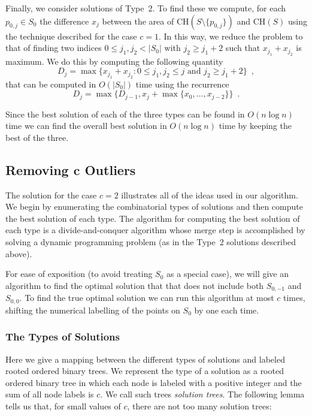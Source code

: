 \documentclass[lotsofwhite]{patmorin}
\newcommand{\ch}{\mathrm{CH}}
\begin{document}
Finally, we consider solutions of Type~2.  To find these we compute,
for each $p_{0,j}\in S_0$ the difference $x_j$ between the area of
$\ch(S\setminus\{p_{0,j}\})$ and $\ch(S)$ using the technique
described for the case $c=1$.  In this way, we reduce the problem to
that of finding two indices $0\le j_1,j_2< |S_0|$ with $j_2\ge j_1+2$
such that $x_{j_1}+x_{j_2}$ is maximum.  We do this by computing the
following quantity
\[
     D_j = \max\{x_{j_1}+x_{j_2} :
       \mbox{$0\le j_1,j_2\le j$ and $j_2 \ge j_1+2$}\} \enspace ,
\]
that can be computed in $O(|S_0|)$ time using the recurrence
\[
    D_j = \max\{D_{j-1}, x_{j} + \max\{x_{0},\ldots,x_{j-2}\}\}
                \enspace .
\]

Since the best solution of each of the three types can be found in
$O(n\log n)$ time we can find the overall best solution in $O(n\log
n)$ time by keeping the best of the three.

\subsection{Removing $\mathbf{c}$ Outliers}

The solution for the case $c=2$ illustrates all of the ideas used in 
our algorithm.  We begin by enumerating the combinatorial types of
solutions and then compute the best solution of each type.  The
algorithm for computing the best solution of each type is a
divide-and-conquer algorithm whose merge step is accomplished by
solving a dynamic programming problem (as in the Type~2 solutions
described above).

For ease of exposition (to avoid treating $S_0$ as a special case), we
will give an algorithm to find the optimal solution that that does not
include both $S_{0,-1}$ and $S_{0,0}$.  To find the true optimal
solution we can run this algorithm at most $c$ times, shifting the
numerical labelling of the points on $S_0$ by one each time.

\subsubsection{The Types of Solutions}

Here we give a mapping between the different types of solutions and
labeled rooted ordered binary trees. We represent the type of a
solution as a rooted ordered binary tree in which each node is labeled
with a positive integer and the sum of all node labels is $c$.  We
call such trees \emph{solution trees}.  The following lemma tells us
that, for small values of $c$, there are not too many solution trees:
 
\end{document}
